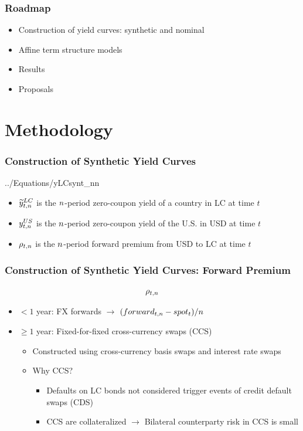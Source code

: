 \documentclass[12pt, aspectratio=169, xcolor=dvipsnames]{beamer} 			         %
\begin{document}
\begin{frame}
\frametitle{Roadmap}
\begin{itemize}
	\item Construction of yield curves: synthetic and nominal
	\item Affine term structure models
	\item Results
	\item Proposals
\end{itemize}
\end{frame}

\section{Methodology}

\begin{frame}
	\frametitle{Construction of \textbf{Synthetic} Yield Curves}
	\vspace{-1cm}
	 {../Equations/yLCsynt_nn}
	\vspace{-0.5cm}
	\begin{itemize}
		\item $\widetilde{y}_{t,n} ^{LC}$ is the $n$-period zero-coupon yield of a country in LC at time $t$
		\item $y_{t,n} ^{US}$ is the $n$-period zero-coupon yield of the U.S. in USD at time $t$
		\item $\rho_{t,n}$ is the $n$-period forward premium from USD to LC at time $t$
	\end{itemize}
\end{frame}

\begin{frame}
	\frametitle{Construction of Synthetic Yield Curves: Forward Premium}
	\vspace{-0.8cm}
	$$\rho_{t,n}$$
	\vspace{-1cm}
	\begin{itemize}
		\item $< 1$ year: FX forwards $\rightarrow$ $(forward_{t,n} - spot_{t})/n$
		\item $\geq 1$ year: Fixed-for-fixed cross-currency swaps (CCS)
		\pause
		\begin{itemize}
			\item Constructed using cross-currency basis swaps and interest rate swaps
			\item Why CCS?
			\begin{itemize}
				\item Defaults on LC bonds not considered trigger events of credit default swaps (CDS)
				\item CCS are collateralized $\rightarrow$ Bilateral counterparty risk in CCS is small
			\end{itemize}
		\end{itemize}
	\end{itemize}
\end{frame}
\end{document}
